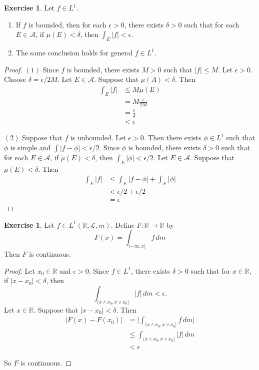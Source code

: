 \documentclass{book}
\theoremstyle{definition}
\newtheorem{ex}[definition]{Exercise}
\newcommand{\del}{\delta}
\newcommand{\ep}{\epsilon}
\newcommand{\R}{\mathbb{R}}
\newcommand{\MA}{\mathcal{A}}
\newcommand{\ML}{\mathcal{L}}
\newcommand{\lex}[1]{\label{ex:#1}}
\DeclareMathOperator*{\0}{\mbf{0}}
\DeclareMathOperator*{\1}{\mbf{1}}
\newcommand{\dm}{\, d m}
\begin{document}
	\begin{ex} \lex{00000} 
		Let $f \in L^1$. 
		\begin{enumerate}
			\item If $f$ is bounded, then for each $\ep >0$, there exists $\del >0$ such that for each $E \in \MA$, if $\mu(E) < \del$, then $\int_E |f| < \ep $.
			\item The same conclusion holds for general $f \in L^1$.
		\end{enumerate} 
	\end{ex}
	
	\begin{proof}
		$(1)$ Since $f$ is bounded, there exists $M >0$ such that $|f| \leq M$. Let $\ep >0$. Choose $\del = \ep/2M$. Let $E \in \MA$. Suppose that $\mu(A) < \del$. Then 
		\begin{align*}
			\int_E|f| 
			& \leq M \mu(E)\\
			&= M\frac{\ep}{2M}\\
			&= \frac{\ep}{2}\\
			&< \ep
		\end{align*}
		
		$(2)$ Suppose that $f$ is unbounded. Let $\epsilon >0$. Then there exists $\phi \in L^1$ such that $\phi$ is simple and $\int|f-\phi| < \ep/2$. Since $\phi$ is bounded, there exists $\del >0 $ such that for each $E \in \MA$, if $\mu(E) < \del$, then $\int_E |\phi| < \ep/2$. Let $E \in \MA$. Suppose that $\mu(E) < \del$. Then 
		\begin{align*}
			\int_E|f|
			& \leq \int_E |f-\phi| + \int_E |\phi|\\
			& < \ep/2 + \ep/2\\
			& = \ep
		\end{align*}   
	\end{proof}
	
	\begin{ex} \lex{00000} 
		Let $f \in L^1(\R, \ML, m)$. Define $F: \R \rightarrow \R$ by $$F(x) = \int_{(-\infty,x]}f \dm$$
		Then $F$ is continuous.
	\end{ex}
	
	\begin{proof}
		Let $x_0 \in \R$ and $\epsilon >0$. Since $f \in L^1$, there exists $\del >0$ such that for $x \in \R$, if $|x-x_0| < \del$, then $$\int_{(x \wedge x_0,x \vee x_0]}|f| \dm < \ep.$$ Let $x \in \R$. Suppose that $|x-x_0|< \del$. Then 
		\begin{align*}
			|F(x)-F(x_0)|
			&= \bigg|\int_{(x \wedge x_0,x \vee x_0]}f \dm \bigg|\\
			& \leq \int_{(x \wedge x_0,x \vee x_0]}|f| \dm \\
			& < \ep
		\end{align*} 
		
		So $F$ is continuous.
		
	\end{proof}
	
\end{document}
